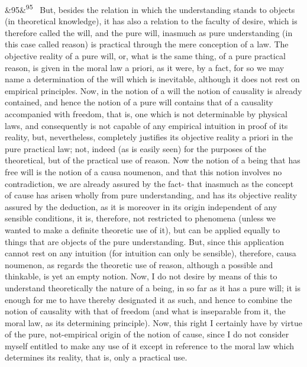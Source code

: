 \documentclass[12pt]{article}
\newcommand{\para}[1][]{\par\noindent\ifx&#1&\else\textsuperscript{\footnotesize #1}~\fi}
\begin{document}
\para[95] But, besides the relation in which the understanding stands to objects (in theoretical knowledge), it has also a relation to the faculty of desire, which is therefore called the will, and the pure will, inasmuch as pure understanding (in this case called reason) is practical through the mere conception of a law. The objective reality of a pure will, or, what is the same thing, of a pure practical reason, is given in the moral law a priori, as it were, by a fact, for so we may name a determination of the will which is inevitable, although it does not rest on empirical principles. Now, in the notion of a will the notion of causality is already contained, and hence the notion of a pure will contains that of a causality accompanied with freedom, that is, one which is not determinable by physical laws, and consequently is not capable of any empirical intuition in proof of its reality, but, nevertheless, completely justifies its objective reality a priori in the pure practical law; not, indeed (as is easily seen) for the purposes of the theoretical, but of the practical use of reason. Now the notion of a being that has free will is the notion of a causa noumenon, and that this notion involves no contradiction, we are already assured by the fact- that inasmuch as the concept of cause has arisen wholly from pure understanding, and has its objective reality assured by the deduction, as it is moreover in its origin independent of any sensible conditions, it is, therefore, not restricted to phenomena (unless we wanted to make a definite theoretic use of it), but can be applied equally to things that are objects of the pure understanding. But, since this application cannot rest on any intuition (for intuition can only be sensible), therefore, causa noumenon, as regards the theoretic use of reason, although a possible and thinkable, is yet an empty notion. Now, I do not desire by means of this to understand theoretically the nature of a being, in so far as it has a pure will; it is enough for me to have thereby designated it as such, and hence to combine the notion of causality with that of freedom (and what is inseparable from it, the moral law, as its determining principle). Now, this right I certainly have by virtue of the pure, not-empirical origin of the notion of cause, since I do not consider myself entitled to make any use of it except in reference to the moral law which determines its reality, that is, only a practical use.
\end{document}
